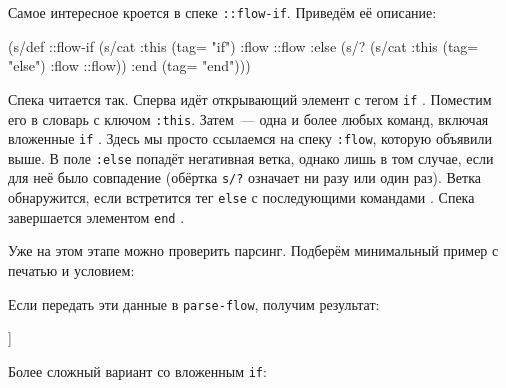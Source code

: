 Самое интересное кроется в спеке \texttt{::flow-if}. Приведём её описание:

\begin{english}
  \begin{clojure/lines}
(s/def ::flow-if
  (s/cat :this (tag= "if")
         :flow ::flow
         :else (s/? (s/cat :this (tag= "else")
                           :flow ::flow))
         :end (tag= "end")))
  \end{clojure/lines}
\end{english}

Спека читается так. Сперва идёт открывающий элемент с тегом \texttt{if}
. Поместим его в словарь с ключом \texttt{:this}. Затем~--- одна и
более любых команд, включая вложенные \texttt{if} . Здесь мы просто
ссылаемся на спеку \texttt{:flow}, которую объявили выше. В поле \texttt{:else}
попадёт негативная ветка, однако лишь в том случае, если для неё было совпадение
(обёртка \verb|s/?| означает ни разу или один раз). Ветка обнаружится, если
встретится тег \verb|else| с последующими командами . Спека
завершается элементом \verb|end| .

Уже на этом этапе можно проверить парсинг. Подберём минимальный пример с печатью
и условием:

\begin{english}
  \begin{clojure}
  \end{clojure}
\end{english}

Если передать эти данные в \texttt{parse-flow}, получим результат:

\begin{english}
  \begin{clojure}
[[:if
  {:this {:command "if" :condition "..."}
   :flow [[:cmd {:command "print" :text "this is true"}]]
   :else
   {:this {:command "else"}
    :flow [[:cmd {:command "print" :text "this is false"}]]}
   :end {:command "end"}}]]
  \end{clojure}
\end{english}

Более сложный вариант со вложенным \texttt{if}:

\begin{english}
  \begin{clojure}
  \end{clojure}
\end{english}

